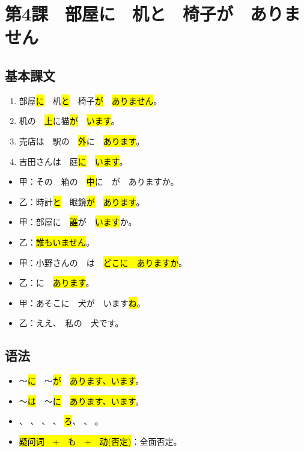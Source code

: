 \section{第4課　部屋に　机と　椅子が　ありません}

\subsection{基本課文}

\begin{enumerate}
    \item 部屋\hl{に}　机\hl{と}　椅子\hl{が}　\hl{ありません}。
    \item 机の　\hl{上}に猫\hl{が}　\hl{います}。
    \item 売店は　駅の　\hl{外}に　\hl{あります}。
    \item 吉田さんは　庭\hl{に}　\hl{います}。
\end{enumerate}

\begin{itemize}
    \item 甲：その　箱の　\hl{中}に　が　ありますか。
    \item 乙：時計\hl{と}　眼鏡\hl{が}　\hl{あります}。
\end{itemize}


\begin{itemize}
   \item 甲：部屋に　\hl{誰}が　\hl{います}か。
   \item 乙：\hl{誰もいません}。
\end{itemize}

\begin{itemize}
   \item 甲：小野さんの　は　\hl{どこに　ありますか}。
   \item 乙：に　\hl{あります}。
\end{itemize}

\begin{itemize}
   \item 甲：あそこに　犬が　います\hl{ね}。　
   \item 乙：ええ、　私の　犬です。
\end{itemize}


\subsection{语法}

\begin{itemize}
    \item 〜\hl{に}　〜\hl{が}　\hl{あります、います}。
    \item 〜\hl{は}　〜\hl{に}　\hl{あります、います}。
    \item 
        \hl{}、
        \hl{}、
        \hl{}、
        \hl{}、
        \hl{ろ}、
        \hl{}、
        \hl{}。
    \item \hl{疑问词　+　も　+　动(否定)}：全面否定。
\end{itemize}

